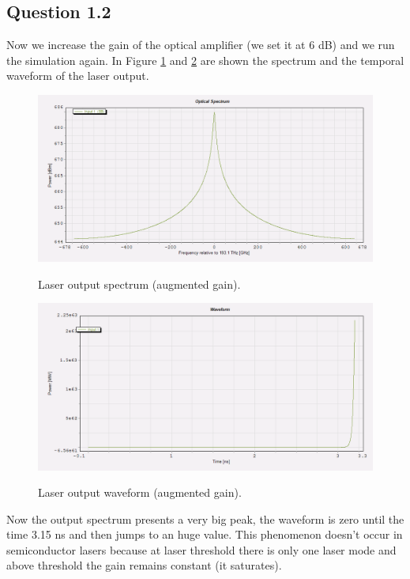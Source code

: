 \documentclass[a4paper,10pt]{report}
\begin{document}
\subsection*{Question 1.2}
Now we increase the gain of the optical amplifier (we set it at 6 dB) and we run the simulation again.
In Figure \ref{Tx1_15} and \ref{Tx1_16} are shown the spectrum and the temporal waveform of the laser output.

\begin{figure}[!ht]
  \centering
  \includegraphics[width=12cm]{Tx1_151.png}\\
  \caption{Laser output spectrum (augmented gain).}
  \label{Tx1_15}
\end{figure}

\begin{figure}[!ht]
  \centering
  \includegraphics[width=12cm]{Tx1_16.png}\\
  \caption{Laser output waveform (augmented gain).}
  \label{Tx1_16}
\end{figure}

Now the output spectrum presents a very big peak, the waveform is zero until the time 3.15 ns and then jumps to an huge value.
This phenomenon doesn't occur in semiconductor lasers because at laser threshold there is only one laser mode and above threshold
the gain remains constant (it saturates).
\end{document}
